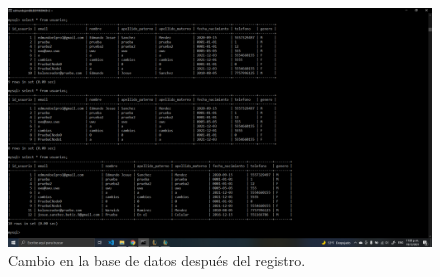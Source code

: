\documentclass[11pt]{article}
\begin{document}
		\begin{figure}[H]
			\centering
			\includegraphics[scale=0.34]{resources/MOVIL1.png}
			\caption{Cambio en la base de datos después del registro.}\label{fig:picture}
		\end{figure}
\end{document}
